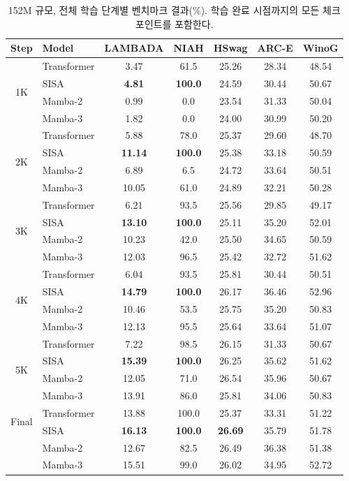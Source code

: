 \documentclass[11pt]{article}
\begin{document}
\begin{table}[h]
\centering
\small
\caption{152M 규모, 전체 학습 단계별 벤치마크 결과(\%). 학습 완료 시점까지의 모든 체크포인트를 포함한다.}
\label{tab:full_results}
\begin{tabular}{clccccc}
\toprule
\textbf{Step} & \textbf{Model} & \textbf{LAMBADA} & \textbf{NIAH} & \textbf{HSwag} & \textbf{ARC-E} & \textbf{WinoG} \\
\midrule
\multirow{4}{*}{1K} & Transformer & 3.47 & 61.5 & 25.26 & 28.34 & 48.54 \\
& SISA & \textbf{4.81} & \textbf{100.0} & 24.59 & 30.44 & 50.67 \\
& Mamba-2 & 0.99 & 0.0 & 23.54 & 31.33 & 50.04 \\
& Mamba-3 & 1.82 & 0.0 & 24.00 & 30.99 & 50.20 \\
\midrule
\multirow{4}{*}{2K} & Transformer & 5.88 & 78.0 & 25.37 & 29.60 & 48.70 \\
& SISA & \textbf{11.14} & \textbf{100.0} & 25.38 & 33.18 & 50.59 \\
& Mamba-2 & 6.89 & 6.5 & 24.72 & 33.64 & 50.51 \\
& Mamba-3 & 10.05 & 61.0 & 24.89 & 32.21 & 50.28 \\
\midrule
\multirow{4}{*}{3K} & Transformer & 6.21 & 93.5 & 25.56 & 29.85 & 49.17 \\
& SISA & \textbf{13.10} & \textbf{100.0} & 25.11 & 35.20 & 52.01 \\
& Mamba-2 & 10.23 & 42.0 & 25.50 & 34.65 & 50.59 \\
& Mamba-3 & 12.03 & 96.5 & 25.42 & 32.72 & 51.62 \\
\midrule
\multirow{4}{*}{4K} & Transformer & 6.04 & 93.5 & 25.81 & 30.44 & 50.51 \\
& SISA & \textbf{14.79} & \textbf{100.0} & 26.17 & 36.46 & 52.96 \\
& Mamba-2 & 10.46 & 53.5 & 25.75 & 35.20 & 50.83 \\
& Mamba-3 & 12.13 & 95.5 & 25.64 & 33.64 & 51.07 \\
\midrule
\multirow{4}{*}{5K} & Transformer & 7.22 & 98.5 & 26.15 & 31.33 & 50.67 \\
& SISA & \textbf{15.39} & \textbf{100.0} & 26.25 & 35.62 & 51.62 \\
& Mamba-2 & 12.05 & 71.0 & 26.54 & 35.96 & 50.67 \\
& Mamba-3 & 13.91 & 86.0 & 25.81 & 34.06 & 50.83 \\
\midrule
\multirow{2}{*}{Final} & Transformer & 13.88 & 100.0 & 25.37 & 33.31 & 51.22 \\
& SISA & \textbf{16.13} & \textbf{100.0} & \textbf{26.69} & 35.79 & 51.78 \\
& Mamba-2 & 12.67 & 82.5 & 26.49 & 36.38 & 51.38 \\
& Mamba-3 & 15.51 & 99.0 & 26.02 & 34.95 & 52.72 \\
\bottomrule
\end{tabular}
\end{table}
\end{document}
